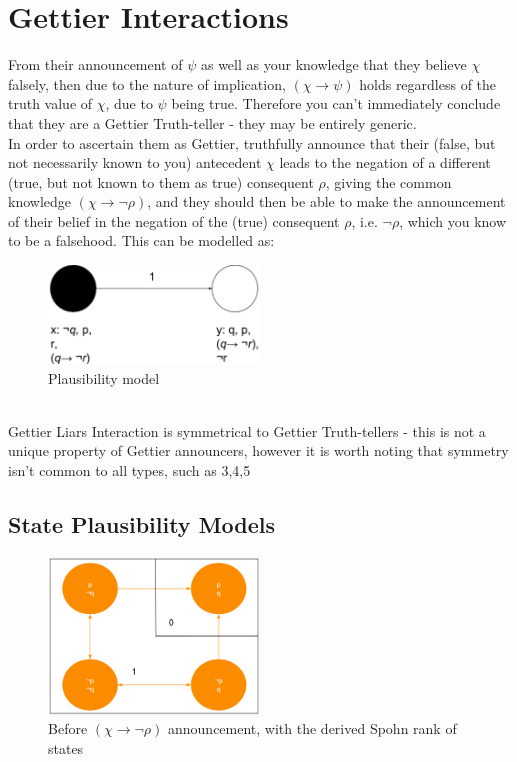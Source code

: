 \documentclass[12pt, titlepage, twoside]{report}
\begin{document}
\section{Gettier Interactions}
From their announcement of $\psi$ as well as your knowledge that they believe $\chi$ falsely, then due to the nature of implication, $(\chi \to \psi)$ holds regardless of the truth value of $\chi$, due to $\psi$ being true. Therefore you can't immediately conclude that they are a Gettier Truth-teller - they may be entirely generic.\\
In order to ascertain them as Gettier, truthfully announce that their (false, but not necessarily known to you) antecedent $\chi$ leads to the negation of a different (true, but not known to them as true) consequent $\rho$,  giving the common knowledge $(\chi \to \neg \rho)$, and they should then be able to make the announcement of their belief in the negation of the (true) consequent $\rho$, i.e. $\neg \rho$, which you know to be a falsehood. This can be modelled as:\\
\begin{figure}[h]
  \centering
  \includegraphics[width=0.5\textwidth]{gettiermodelbase.eps}
  \caption{Plausibility model}
\end{figure}\\
Gettier Liars Interaction is symmetrical to Gettier Truth-tellers - this is not a unique property  of Gettier announcers, however it is worth noting that symmetry isn't common to all types, such as 3,4,5

\subsection{State Plausibility Models}

\begin{figure}[h]
  \centering
  \includegraphics[width=0.5\textwidth]{slide19.eps}
  \caption{Before $(\chi \to \neg \rho)$ announcement, with the derived Spohn rank of states}
\end{figure}
\end{document}
